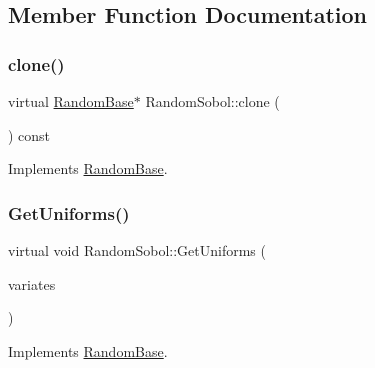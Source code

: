 \subsection{Member Function Documentation}
\hypertarget{classRandomSobol_ac0c06a34aa22ed8caa009d42d3212365}{}\label{classRandomSobol_ac0c06a34aa22ed8caa009d42d3212365} 
\subsubsection{\texorpdfstring{clone()}{clone()}}
{\footnotesize\ttfamily virtual \hyperlink{classRandomBase}{Random\+Base}$\ast$ Random\+Sobol\+::clone (\begin{DoxyParamCaption}{ }\end{DoxyParamCaption}) const\hspace{0.3cm}{\ttfamily [virtual]}}



Implements \hyperlink{classRandomBase_a0906f4590283535ec40427ad31ba7850}{Random\+Base}.

\hypertarget{classRandomSobol_ad4174c772925a5895828bcc87cc69fd6}{}\label{classRandomSobol_ad4174c772925a5895828bcc87cc69fd6} 
\subsubsection{\texorpdfstring{Get\+Uniforms()}{GetUniforms()}\hspace{0.1cm}{\footnotesize\ttfamily [1/2]}}
{\footnotesize\ttfamily virtual void Random\+Sobol\+::\+Get\+Uniforms (\begin{DoxyParamCaption}\item[{\hyperlink{classMJArray}{M\+J\+Array} \&}]{variates }\end{DoxyParamCaption})\hspace{0.3cm}{\ttfamily [virtual]}}



Implements \hyperlink{classRandomBase_aa061fb77f53969f6fbe40c7454c69eb9}{Random\+Base}.

\hypertarget{classRandomSobol_ab358820392404ae723a0148d4d014553}{}\label{classRandomSobol_ab358820392404ae723a0148d4d014553} 
